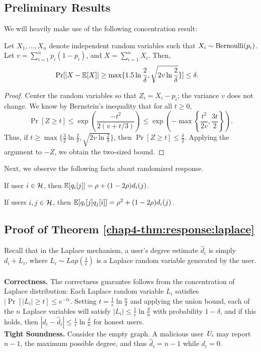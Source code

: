 \subsection{Preliminary Results}
We will heavily make use of the following concentration result:

\begin{lemma}\label{chap4-lem:bern-concentration}
    Let $X_1, \ldots, X_n$ denote independent random variables such that $X_i \sim \textnormal{Bernoulli}(p_i)$. Let $v = \sum_{i=1}^n p_i(1-p_i)$, and $X = \sum_{i=1}^n X_i$. Then,
    \begin{align*}
        \Pr[|X - \operatorname{\mathbb{E}}[X]| \geq \max\{1.5 \ln \frac{2}{\delta}, \sqrt{2v\ln \frac{2}{\delta}}\}] &\leq \delta.
    \end{align*}
\end{lemma}
\begin{proof}
    Center the random variables so that $Z_i = X_i - p_i$; the variance $v$ does not change. We know by Bernstein's inequality that for all $t \geq 0$,
    \[
        \Pr[Z \geq t] \leq \exp\left(\frac{-t^2}{2(v + t / 3)}\right) \leq \exp\left(- \max \left\{ \frac{t^2}{2v}, \frac{3t}{2}\right\}\right).
    \]
    Thus, if $t \geq \max\{\frac{3}{2} \ln \frac{2}{\delta}, \sqrt{2 v \ln \frac{2}{\delta}}\}$, then $\Pr[Z \geq t] \leq \frac{\delta}{2}$. Applying the argument to $-Z$, we obtain the two-sized bound.
    
\end{proof}

Next, we observe the following facts about randomized response.
\begin{fact}\label{chap4-fact:rr-exp}
If user $i \in \mathcal{H}$, then $\operatorname{\mathbb{E}}[q_i[j]] = \rho + (1-2\rho) d_i(j)$.
\end{fact}

\begin{fact}\label{chap4-fact:2rr-exp}
If users $i,j \in \mathcal{H}$, then $\operatorname{\mathbb{E}}[q_i[j]q_j[i]] = \rho^2 + (1-2\rho) d_i(j)$.
\end{fact}
\subsection{Proof of Theorem \ref{chap4-thm:response:laplace}}\label{chap4-app:thm:response:laplace}
Recall that in the Laplace mechanism, a user's degree estimate $\hat{d}_i$ is simply $d_i + L_i$, where $L_i \sim Lap(\frac{1}{\epsilon})$ is a Laplace random variable generated by the user.\\\\\noindent
\textbf{Correctness.} The correctness guarantee follows from the concentration of Laplace distribution: Each Laplace random variable $L_i$ satisfies $|\Pr[|L_i| \geq t] \leq e^{-t\epsilon}$. Setting $t = \frac{1}{\epsilon}\ln \frac{n}{\delta}$ and applying the union bound, each of the $n$ Laplace variables will satisfy $|L_i| \leq \frac{1}{\epsilon}\ln \frac{\delta}{n}$ with probability $1-\delta$, and if this holds, then $|d_i - \hat{d}_i| \leq \frac{1}{\epsilon}\ln \frac{\delta}{n}$ for honest users.
\\
\noindent\textbf{Tight Soundness.} Consider the empty graph. A malicious user $\textit{U}_i$ may report $n-1$, the maximum possible degree, and thus $\hat{d}_i = n-1$ while $d_i = 0$.

